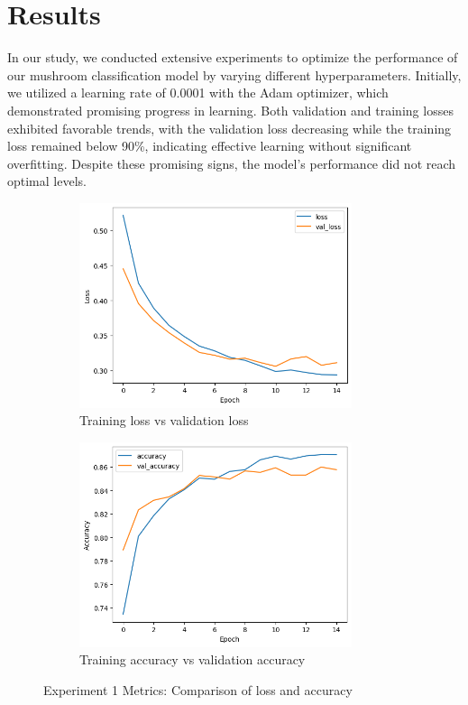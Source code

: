 \section{Results}




In our study, we conducted extensive experiments to optimize the performance of our mushroom classification model by varying different hyperparameters. Initially, we utilized a learning rate of 0.0001 with the Adam optimizer, which demonstrated promising progress in learning. Both validation and training losses exhibited favorable trends, with the validation loss decreasing while the training loss remained below 90\%, indicating effective learning without significant overfitting. Despite these promising signs, the model's performance did not reach optimal levels.

\begin{figure}[!ht]
    \centering
    \begin{subfigure}{0.45\textwidth} %
        \centering
        \includegraphics[height=6cm, width=\linewidth]{images/1.loss.png}
        \caption{Training loss vs validation loss} %
    \end{subfigure}
    \hfill
    \begin{subfigure}{0.45\textwidth} %
        \centering
        \includegraphics[height=6cm, width=\linewidth]{images/1.Accuracy.png}
        \caption{Training accuracy vs validation accuracy} %
    \end{subfigure}
    \caption{Experiment 1 Metrics: Comparison of loss and accuracy} %
\end{figure}



